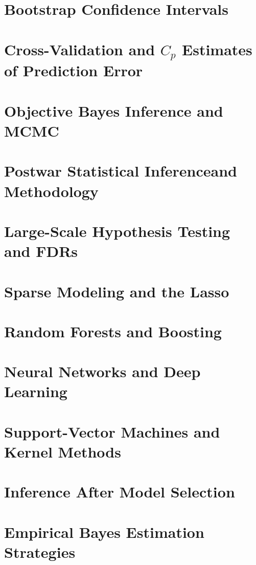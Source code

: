 \documentclass[12pt,a4paper]{article}
\begin{document}
\section{Bootstrap Confidence Intervals}

\section{Cross-Validation and $C_{p}$ Estimates of Prediction Error}

\section{Objective Bayes Inference and MCMC}

\section{Postwar Statistical Inferenceand Methodology}

\section{Large-Scale Hypothesis Testing and FDRs}

\section{Sparse Modeling and the Lasso}

\section{Random Forests and Boosting}

\section{Neural Networks and Deep Learning}

\section{Support-Vector Machines and Kernel Methods}

\section{Inference After Model Selection}

\section{Empirical Bayes Estimation Strategies}
\end{document}
